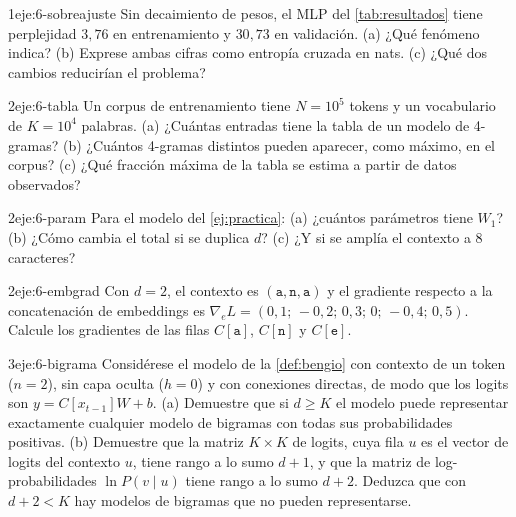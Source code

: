 \begin{ejercicio}{1}{eje:6-sobreajuste}
Sin decaimiento de pesos, el MLP del \cref{tab:resultados} tiene perplejidad $3{,}76$ en entrenamiento y $30{,}73$ en validación. (a) ¿Qué fenómeno indica? (b) Exprese ambas cifras como entropía cruzada en nats. (c) ¿Qué dos cambios reducirían el problema?
\end{ejercicio}

\begin{ejercicio}{2}{eje:6-tabla}
Un corpus de entrenamiento tiene $N=10^{5}$ tokens y un vocabulario de $K=10^{4}$ palabras. (a) ¿Cuántas entradas tiene la tabla de un modelo de 4-gramas? (b) ¿Cuántos 4-gramas distintos pueden aparecer, como máximo, en el corpus? (c) ¿Qué fracción máxima de la tabla se estima a partir de datos observados?
\end{ejercicio}

\begin{ejercicio}{2}{eje:6-param}
Para el modelo del \cref{ej:practica}: (a) ¿cuántos parámetros tiene $W_1$? (b) ¿Cómo cambia el total si se duplica $d$? (c) ¿Y si se amplía el contexto a 8 caracteres?
\end{ejercicio}

\begin{ejercicio}{2}{eje:6-embgrad}
Con $d=2$, el contexto es $(\texttt{a},\texttt{n},\texttt{a})$ y el gradiente respecto a la concatenación de embeddings es $\nabla_{\!e}L=(0{,}1;\,-0{,}2;\,0{,}3;\,0;\,-0{,}4;\,0{,}5)$. Calcule los gradientes de las filas $C[\texttt{a}]$, $C[\texttt{n}]$ y $C[\texttt{e}]$.
\end{ejercicio}

\begin{ejercicio}{3}{eje:6-bigrama}
Considérese el modelo de la \cref{def:bengio} con contexto de un token ($n=2$), sin capa oculta ($h=0$) y con conexiones directas, de modo que los logits son $y=C[x_{t-1}]W+b$. (a) Demuestre que si $d\ge K$ el modelo puede representar exactamente cualquier modelo de bigramas con todas sus probabilidades positivas. (b) Demuestre que la matriz $K\times K$ de logits, cuya fila $u$ es el vector de logits del contexto $u$, tiene rango a lo sumo $d+1$, y que la matriz de log-probabilidades $\ln P(v\mid u)$ tiene rango a lo sumo $d+2$. Deduzca que con $d+2<K$ hay modelos de bigramas que no pueden representarse.
\end{ejercicio}
